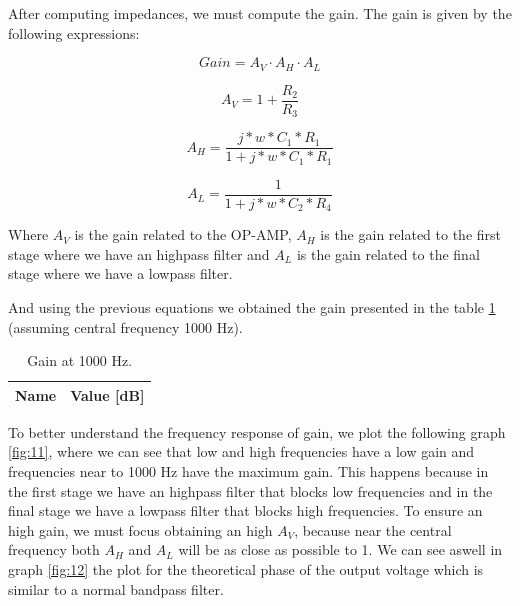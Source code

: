 \par After computing impedances, we must compute the gain. The gain is given by the following expressions:

\begin {equation}
Gain = A_V\cdot A_H \cdot A_L
\label{eq:31}
\end {equation}

\begin {equation}
A_V = 1+\frac{R_2}{R_3}
\label{eq:32}
\end {equation}

\begin {equation}
A_H = \frac{j*w*C_1*R_1}{1+j*w*C_1*R_1}
\label{eq:33}
\end {equation}

\begin {equation}
A_L = \frac{1}{1+j*w*C_2*R_4}
\label{eq:34}
\end {equation}

Where $A_{V}$ is the gain related to the OP-AMP, $A_{H}$ is the gain related to the first stage where we have an highpass filter and $A_{L}$ is the gain related to the
final stage where we have a lowpass filter.

\par And using the previous equations we obtained the gain presented in the table \ref{tab:2} (assuming central frequency 1000 Hz).

\begin{table}[h]
  \centering
  \begin{tabular}{|l|r|}
    \hline    
    {\bf Name} & {\bf Value [dB]} \\ \hline
    
  \end{tabular}
  \caption{Gain at 1000 Hz.}
  \label{tab:2}
\end{table}

\par To better understand the frequency response of gain, we plot the following graph \ref{fig:11}, where we can see that low and high frequencies have a low gain and 
frequencies near to 1000 Hz have the maximum gain. This happens because in the first stage we have an highpass filter that blocks low frequencies and in the final
stage we have a lowpass filter that blocks high frequencies. To ensure an high gain, we must focus obtaining an high $A_{V}$, because near the central frequency both $A_{H}$
and $A_{L}$ will be as close as possible to 1. 
We can see aswell in graph \ref{fig:12} the plot for the theoretical phase of the output voltage which is similar to a normal bandpass filter. 

